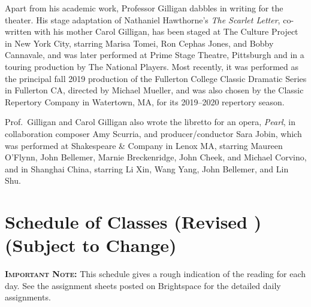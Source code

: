 \documentclass[11pt]{jgsyllabus}\usepackage[]{graphicx}\usepackage[]{xcolor}
\begin{document}
Apart from his academic work, Professor Gilligan dabbles in writing for the
theater. His stage adaptation of Nathaniel Hawthorne's %
\emph{The Scarlet Letter},
co-written with his mother Carol Gilligan, has been staged at The Culture
Project in New York City, starring
Marisa Tomei, Ron Cephas Jones, and Bobby Cannavale, and was later performed
at Prime Stage Theatre, Pittsburgh and in a touring production by The National
Players. Most recently, it was performed as the principal fall 2019 production
of the Fullerton College Classic Dramatic Series in Fullerton CA,
directed by Michael Mueller,
and was also chosen by the Classic Repertory Company in Watertown, MA,
for its 2019--2020 repertory season.

Prof.\ Gilligan and Carol Gilligan also wrote the libretto for an opera,
\emph{Pearl}, in collaboration composer Amy Scurria, and producer/conductor
Sara Jobin, which was performed at Shakespeare \& Company in Lenox MA,
starring Maureen O'Flynn, John Bellemer, Marnie Breckenridge, John Cheek, %
and Michael Corvino, and in Shanghai China,
starring Li Xin, Wang Yang, John Bellemer, and Lin Shu.
\fi
%
%
%
%
%
%

\clearpage
\appendix
\setcounter{secnumdepth}{0}
\newcommand{\maybehline}{\hline}%
\setlength\extrarowheight{4pt}
\section[Class Schedule]{Schedule of Classes
\ifrevised
	(Revised \RevisionDate)%
\else
	(Subject to Change)%
\fi}

\textbf{\scshape Important Note:} This schedule gives a rough indication of the reading for each day. See the assignment sheets posted on Brightspace for the detailed daily assignments.
\end{document}
